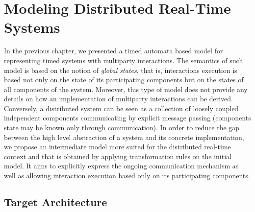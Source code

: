 \chapter{Modeling Distributed Real-Time Systems}\label{chap:3} 
\minitoc
In the previous chapter, we presented a timed automata based model for representing 
timed systems with multiparty interactions. The semantics of such model is based on 
the notion of \emph{global states}, that is, interactions execution is based not only on the 
state of its participating components but on the states of all components of the system.
Moreover, this type of model does not provide any details on how an implementation of 
multiparty interactions can be derived.
Conversely, a distributed system can be seen as a collection of loosely coupled independent
components communicating by explicit message passing (components state may be known only
through communication). 
In order to reduce the gap between the high level abstraction of a system and its concrete
implementation, we propose an intermediate model more suited for the distributed real-time
context and that is obtained by applying transformation rules on the initial model. 
It aims to explicitly express the ongoing communication mechanism as well as 
allowing interaction execution based only on its participating components.

\section{Target Architecture}

